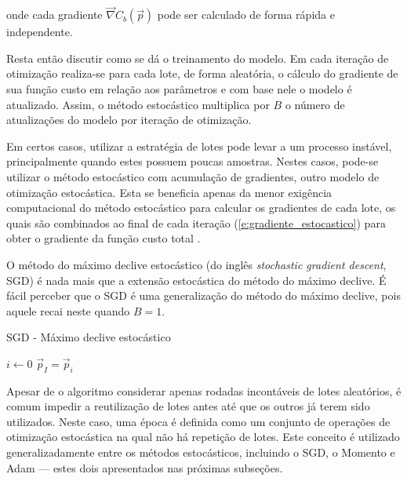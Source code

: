       \noindent onde cada gradiente $\vec{\nabla} C_b(\vec{p})$ pode ser calculado de forma rápida e independente.

      Resta então discutir como se dá o treinamento do modelo. Em cada iteração de otimização realiza-se para cada lote, de forma aleatória, o cálculo do gradiente de sua função custo em relação aos parâmetros e com base nele o modelo é atualizado. Assim, o método estocástico multiplica por $B$ o número de atualizações do modelo por iteração de otimização.

      Em certos casos, utilizar a estratégia de lotes pode levar a um processo instável, principalmente quando estes possuem poucas amostras. Nestes casos, pode-se utilizar o método estocástico com acumulação de gradientes, outro modelo de otimização estocástica. Esta se beneficia apenas da menor exigência computacional do método estocástico para calcular os gradientes de cada lote, os quais são combinados ao final de cada iteração (\ref{e:gradiente_estocastico}) para obter o gradiente da função custo total .

      O método do máximo declive estocástico (do inglês \textit{stochastic gradient descent}, SGD) é nada mais que a extensão estocástica do método do máximo declive. É fácil perceber que o SGD é uma generalização do método do máximo declive, pois aquele recai neste quando $B=1$.

      \begin{algorithm}
        \caption{SGD - Máximo declive estocástico}\label{alg:sgd}
        \BlankLine
        $i \gets 0$
        $\vec{p}_I = \vec{p}_i$
      \end{algorithm}


      Apesar de o algoritmo considerar apenas rodadas incontáveis de lotes aleatórios, é comum impedir a reutilização de lotes antes até que os outros já terem sido utilizados. Neste caso, uma época é definida como um conjunto de operações de otimização estocástica na qual não há repetição de lotes. Este conceito é utilizado generalizadamente entre os métodos estocásticos, incluindo o SGD, o Momento e Adam --- estes dois apresentados nas próximas subseções.

